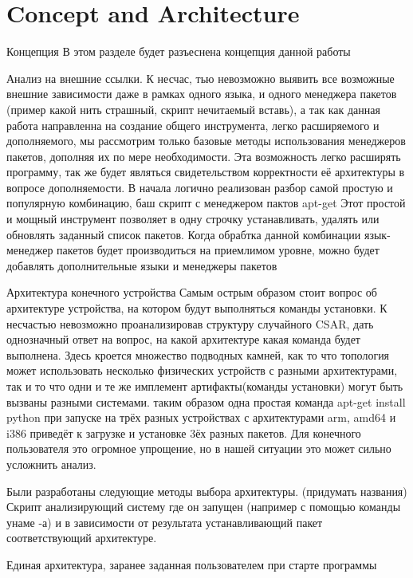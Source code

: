 
\chapter{Concept and Architecture}\label{chap:conarch}

Концепция
В этом разделе будет разъеснена концепция данной работы

Анализ на внешние ссылки. 
К несчас, тью невозможно выявить все возможные внешние зависимости даже в рамках одного языка, и одного менеджера пакетов (пример какой нить страшный, скрипт нечитаемый вставь), а так как данная работа направленна на создание общего инструмента, легко расширяемого и дополняемого, мы рассмотрим только базовые методы использования менеджеров пакетов, дополняя их по мере необходимости. Эта возможность легко расширять программу, так же будет являться свидетельством корректности её архитектуры в вопросе дополняемости.
В начала логично реализован разбор самой простую и популярную комбинацию, баш скрипт с менеджером пактов apt-get 
Этот простой и мощный инструмент позволяет в одну строчку устанавливать, удалять или обновлять заданный список пакетов.
Когда обрабтка данной комбинации язык-менеджер пакетов будет производиться на приемлимом уровне, можно будет добавлять дополнительные языки и менеджеры пакетов

Архитектура конечного устройства
Самым острым образом стоит вопрос об архитектуре устройства, на котором будут выполняться команды установки. 
К несчастью невозможно проанализировав структуру случайного CSAR, дать однозначный ответ на вопрос, на какой архитектуре какая команда будет выполнена. Здесь кроется множество подводных камней, как то что топология может использовать несколько физических устройств с разными архитектурами, так и то что одни и те же имплемент артифакты(команды установки) могут быть вызваны разными системами. таким образом одна простая команда apt-get install python при запуске на трёх разных устройствах с архитектурами arm, amd64 и i386 приведёт к загрузке и установке 3ёх разных пакетов. Для конечного пользователя это огромное упрощение, но в нашей ситуации это может сильно усложнить анализ.

Были разработаны следующие методы выбора архитектуры. 
(придумать названия)
Скрипт анализирующий систему где он запущен (например с помощью команды унаме -а) и в зависимости от результата устанавливающий пакет соответствующий архитектуре. 

Единая архитектура, заранее заданная пользователем при старте программы

